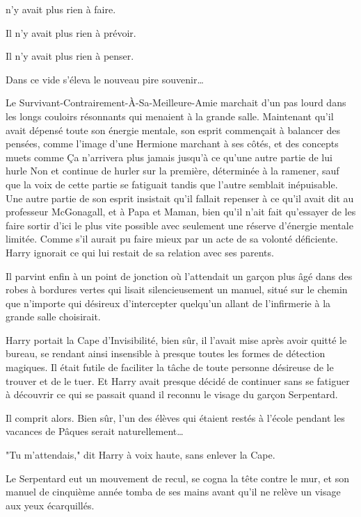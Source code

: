 
 n'y avait plus rien à faire.

\hplettrineextrapara
Il n'y avait plus rien à prévoir.

Il n'y avait plus rien à penser.

Dans ce vide s'éleva le nouveau pire souvenir…

Le Survivant-Contrairement-À-Sa-Meilleure-Amie marchait d'un pas lourd dans les longs couloirs résonnants qui menaient à la grande salle. Maintenant qu'il avait dépensé toute son énergie mentale, son esprit commençait à balancer des pensées, comme l'image d'une Hermione marchant à ses côtés, et des concepts muets comme Ça n'arrivera plus jamais jusqu'à ce qu'une autre partie de lui hurle Non et continue de hurler sur la première, déterminée à la ramener, sauf que la voix de cette partie se fatiguait tandis que l'autre semblait inépuisable. Une autre partie de son esprit insistait qu'il fallait repenser à ce qu'il avait dit au professeur McGonagall, et à Papa et Maman, bien qu'il n'ait fait qu'essayer de les faire sortir d'ici le plus vite possible avec seulement une réserve d'énergie mentale limitée. Comme s'il aurait pu faire mieux par un acte de sa volonté déficiente. Harry ignorait ce qui lui restait de sa relation avec ses parents.

Il parvint enfin à un point de jonction où l'attendait un garçon plus âgé dans des robes à bordures vertes qui lisait silencieusement un manuel, situé sur le chemin que n'importe qui désireux d'intercepter quelqu'un allant de l'infirmerie à la grande salle choisirait.

Harry portait la Cape d'Invisibilité, bien sûr, il l'avait mise après avoir quitté le bureau, se rendant ainsi insensible à presque toutes les formes de détection magiques. Il était futile de faciliter la tâche de toute personne désireuse de le trouver et de le tuer. Et Harry avait presque décidé de continuer sans se fatiguer à découvrir ce qui se passait quand il reconnu le visage du garçon Serpentard.

Il comprit alors. Bien sûr, l'un des élèves qui étaient restés à l'école pendant les vacances de Pâques serait naturellement…

"Tu m'attendais," dit Harry à voix haute, sans enlever la Cape.

Le Serpentard eut un mouvement de recul, se cogna la tête contre le mur, et son manuel de cinquième année tomba de ses mains avant qu'il ne relève un visage aux yeux écarquillés.

